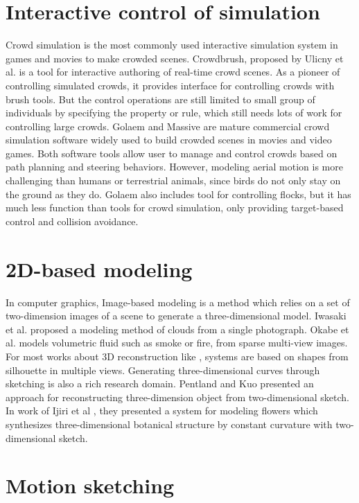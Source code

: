 \section{Interactive control of simulation}

Crowd simulation is the most commonly used interactive simulation system in games and movies to make crowded scenes. Crowdbrush, proposed by Ulicny et al. \cite{Brush} is a tool for interactive authoring of real-time crowd scenes. As a pioneer of controlling simulated crowds, it provides interface for controlling crowds with brush tools. But the control operations are still limited to small group of individuals by specifying the property or rule, which still needs lots of work for controlling large crowds. Golaem\cite{Golaem} and Massive\cite{Massive} are mature commercial crowd simulation software widely used to build crowded scenes in movies and video games. Both software tools allow user to manage and control crowds based on path planning and steering behaviors. However, modeling aerial motion is more challenging than humans or terrestrial animals, since birds do not only stay on the ground as they do. Golaem also includes tool for controlling flocks, but it has much less function than tools for crowd simulation, only providing target-based control and collision avoidance.

\section{2D-based modeling}

In computer graphics, Image-based modeling is a method which relies on a set of two-dimension images of a scene to generate a three-dimensional model. Iwasaki et al. \cite{Cloud} proposed a modeling method of clouds from a single photograph. Okabe et al. \cite{Fluid} models volumetric fluid such as smoke or fire, from sparse multi-view images. For most works about 3D reconstruction like \cite{Reconstruction}, systems are based on shapes from silhouette in multiple views. Generating three-dimensional curves through sketching is also a rich research domain. Pentland and Kuo \cite{Sketch} presented an approach for reconstructing three-dimension object from two-dimensional sketch. In work of Ijiri et al \cite{Plant}, they presented a system for modeling flowers which synthesizes three-dimensional botanical structure by constant curvature with two-dimensional sketch.


\section{Motion sketching}

